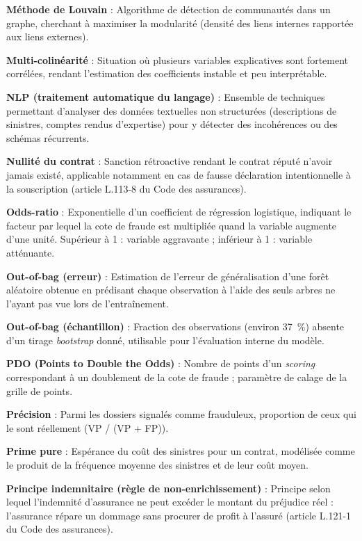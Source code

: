 \textbf{Méthode de Louvain} : Algorithme de détection de communautés dans un graphe, cherchant à maximiser la modularité (densité des liens internes rapportée aux liens externes).

\textbf{Multi-colinéarité} : Situation où plusieurs variables explicatives sont fortement corrélées, rendant l'estimation des coefficients instable et peu interprétable.

\textbf{NLP (traitement automatique du langage)} : Ensemble de techniques permettant d'analyser des données textuelles non structurées (descriptions de sinistres, comptes rendus d'expertise) pour y détecter des incohérences ou des schémas récurrents.

\textbf{Nullité du contrat} : Sanction rétroactive rendant le contrat réputé n'avoir jamais existé, applicable notamment en cas de fausse déclaration intentionnelle à la souscription (article L.113-8 du Code des assurances).

\textbf{Odds-ratio} : Exponentielle d'un coefficient de régression logistique, indiquant le facteur par lequel la cote de fraude est multipliée quand la variable augmente d'une unité. Supérieur à 1 : variable aggravante ; inférieur à 1 : variable atténuante.

\textbf{Out-of-bag (erreur)} : Estimation de l'erreur de généralisation d'une forêt aléatoire obtenue en prédisant chaque observation à l'aide des seuls arbres ne l'ayant pas vue lors de l'entraînement.

\textbf{Out-of-bag (échantillon)} : Fraction des observations (environ 37~\%) absente d'un tirage \textit{bootstrap} donné, utilisable pour l'évaluation interne du modèle.

\textbf{PDO (Points to Double the Odds)} : Nombre de points d'un \textit{scoring} correspondant à un doublement de la cote de fraude ; paramètre de calage de la grille de points.

\textbf{Précision} : Parmi les dossiers signalés comme frauduleux, proportion de ceux qui le sont réellement (VP / (VP + FP)).

\textbf{Prime pure} : Espérance du coût des sinistres pour un contrat, modélisée comme le produit de la fréquence moyenne des sinistres et de leur coût moyen.

\textbf{Principe indemnitaire (règle de non-enrichissement)} : Principe selon lequel l'indemnité d'assurance ne peut excéder le montant du préjudice réel : l'assurance répare un dommage sans procurer de profit à l'assuré (article L.121-1 du Code des assurances).

